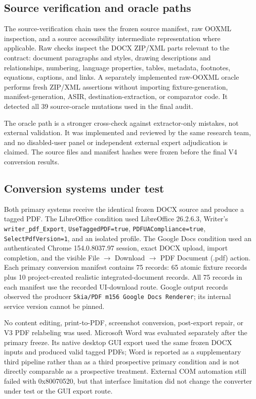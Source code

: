 \subsection{Source verification and oracle paths}
The source-verification chain uses the frozen source manifest, raw OOXML inspection, and a source accessibility intermediate representation where applicable. Raw checks inspect the DOCX ZIP/XML parts relevant to the contract: document paragraphs and styles, drawing descriptions and relationships, numbering, language properties, tables, metadata, footnotes, equations, captions, and links. A separately implemented raw-OOXML oracle performs fresh ZIP/XML assertions without importing fixture-generation, manifest-generation, ASIR, destination-extraction, or comparator code. It detected all 39 source-oracle mutations used in the final audit.

The oracle path is a stronger cross-check against extractor-only mistakes, not external validation. It was implemented and reviewed by the same research team, and no disabled-user panel or independent external expert adjudication is claimed. The source files and manifest hashes were frozen before the final V4 conversion results.

\subsection{Conversion systems under test}
Both primary systems receive the identical frozen DOCX source and produce a tagged PDF. The LibreOffice condition used LibreOffice 26.2.6.3, Writer's \texttt{writer\_pdf\_Export}, \texttt{UseTaggedPDF=true}, \texttt{PDFUACompliance=true}, \texttt{SelectPdfVersion=1}, and an isolated profile. The Google Docs condition used an authenticated Chrome 154.0.8037.97 session, exact DOCX upload, import completion, and the visible File $\rightarrow$ Download $\rightarrow$ PDF Document (.pdf) action. Each primary conversion manifest contains 75 records: 65 atomic fixture records plus 10 project-created realistic integrated-document records. All 75 records in each manifest use the recorded UI-download route. Google output records observed the producer \texttt{Skia/PDF m156 Google Docs Renderer}; its internal service version cannot be pinned.

No content editing, print-to-PDF, screenshot conversion, post-export repair, or V3 PDF relabeling was used. Microsoft Word was evaluated separately after the primary freeze. Its native desktop GUI export used the same frozen DOCX inputs and produced valid tagged PDFs; Word is reported as a supplementary third pipeline rather than as a third prospective primary condition and is not directly comparable as a prospective treatment. External COM automation still failed with 0x80070520, but that interface limitation did not change the converter under test or the GUI export route.

